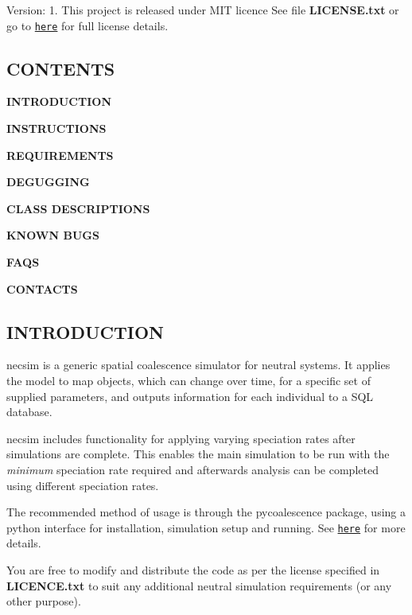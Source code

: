 Version\+: 1. This project is released under M\+IT licence See file {\bfseries L\+I\+C\+E\+N\+S\+E.\+txt} or go to \href{https://opensource.org/licenses/MIT}{\tt here} for full license details.

\subsection*{C\+O\+N\+T\+E\+N\+TS}


\begin{DoxyItemize}
\item {\bfseries I\+N\+T\+R\+O\+D\+U\+C\+T\+I\+ON}
\item {\bfseries I\+N\+S\+T\+R\+U\+C\+T\+I\+O\+NS}
\item {\bfseries R\+E\+Q\+U\+I\+R\+E\+M\+E\+N\+TS}
\item {\bfseries D\+E\+G\+U\+G\+G\+I\+NG}
\item {\bfseries C\+L\+A\+SS D\+E\+S\+C\+R\+I\+P\+T\+I\+O\+NS}
\item {\bfseries K\+N\+O\+WN B\+U\+GS}
\item {\bfseries F\+A\+QS}
\item {\bfseries C\+O\+N\+T\+A\+C\+TS}
\end{DoxyItemize}

\subsection*{I\+N\+T\+R\+O\+D\+U\+C\+T\+I\+ON}

necsim is a generic spatial coalescence simulator for neutral systems. It applies the model to map objects, which can change over time, for a specific set of supplied parameters, and outputs information for each individual to a S\+QL database.

necsim includes functionality for applying varying speciation rates after simulations are complete. This enables the main simulation to be run with the {\itshape minimum} speciation rate required and afterwards analysis can be completed using different speciation rates.

The recommended method of usage is through the pycoalescence package, using a python interface for installation, simulation setup and running. See \href{http://pycoalescence.readthedocs.io/}{\tt here} for more details.

You are free to modify and distribute the code as per the license specified in {\bfseries L\+I\+C\+E\+N\+C\+E.\+txt} to suit any additional neutral simulation requirements (or any other purpose).

